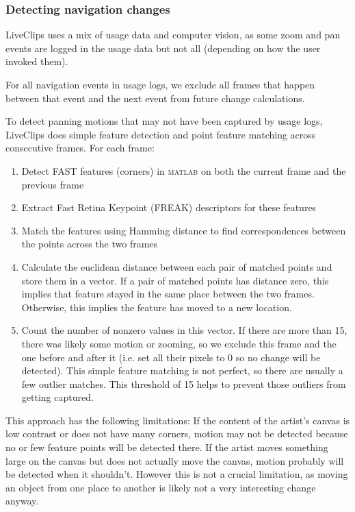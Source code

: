 \subsubsection{Detecting navigation changes}
LiveClips uses a mix of usage data and computer vision, as some zoom and pan events are logged in the usage data but not all (depending on how the user invoked them).

For all navigation events in usage logs, we exclude all frames that happen between that event and the next event from future change calculations.

To detect panning motions that may not have been captured by usage logs, LiveClips does simple feature detection and point feature matching across consecutive frames. For each frame:
\begin{enumerate}
\item Detect FAST features (corners) in \textsc{matlab} on both the current frame and the previous frame
\item Extract Fast Retina Keypoint (FREAK) descriptors for these features
\item Match the features using Hamming distance to find correspondences between the points across the two frames
\item Calculate the euclidean distance between each pair of matched points and store them in a vector. If a pair of matched points has distance zero, this implies that feature stayed in the same place between the two frames. Otherwise, this implies the feature has moved to a new location.
\item Count the number of nonzero values in this vector. If there are more than 15, there was likely some motion or zooming, so we exclude this frame and the one before and after it (i.e. set all their pixels to 0 so no change will be detected). This simple feature matching is not perfect, so there are usually a few outlier matches. This threshold of 15 helps to prevent those outliers from getting captured.
\end{enumerate}

This approach has the following limitations: If the content of the artist's canvas is low contrast or does not have many corners, motion may not be detected because no or few feature points will be detected there. If the artist moves something large on the canvas but does not actually move the canvas, motion probably will be detected when it shouldn't. However this is not a crucial limitation, as moving an object from one place to another is likely not a very interesting change anyway.

